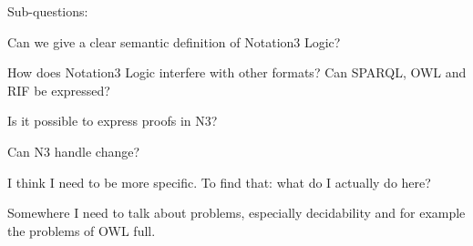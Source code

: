 Sub-questions:

Can we give a clear semantic definition of Notation3 Logic?

How does Notation3 Logic interfere with other formats? Can SPARQL, OWL and RIF be expressed?

Is it possible to express proofs in N3?

Can N3 handle change?

I think I need to be more specific. To find that: what do I actually do here?



% 
% 



Somewhere I need to talk about problems, especially decidability and for example the problems of OWL full.